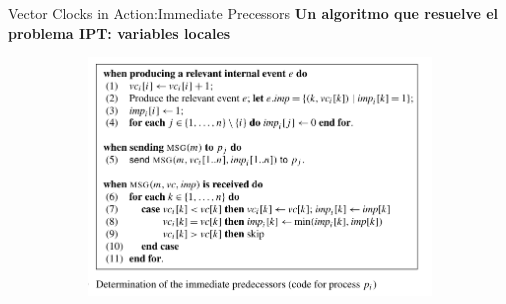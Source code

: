 \begin{frame}[fragile]{Vector Clocks in Action:}{Immediate Precessors}
    \justifying
    \textbf{Un algoritmo que resuelve el problema IPT: variables locales}
    \begin{figure}
        \centering
        \begin{subfigure}[b]{\textwidth}
            \includegraphics[scale=0.7]{Imagenes/algoIPT.png}
            \label{fig:ejemplo1}
        \end{subfigure}
    \end{figure}


\end{frame}